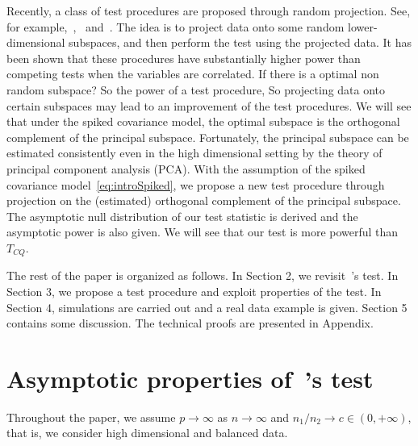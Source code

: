 \documentclass[review]{elsarticle}
\theoremstyle{plain}
\theoremstyle{definition}
\theoremstyle{remark}
\begin{document}
Recently, a class of test procedures are proposed through random projection.
See, for example,~\cite{Lopes2015A},~\cite{Thulin2014A} and~\cite{Srivastava2014RAPTT}.
The idea is to project data onto some random lower-dimensional subspaces, and then perform the test using the projected data.
It has been shown that these procedures have substantially higher power than competing tests when the variables are correlated. 
{\color{red}
If there is a optimal non random subspace?
So the power of a test procedure,
So projecting data onto certain subspaces may lead to an improvement of the test procedures.
}
We will see that under the spiked covariance model, the optimal subspace is the orthogonal complement of the principal subspace.
Fortunately, the principal subspace can be estimated consistently even in the high dimensional setting by the theory of principal component analysis (PCA).
With the assumption of the spiked covariance model~\eqref{eq:introSpiked}, we propose a new test procedure through projection on the (estimated) orthogonal complement of the principal subspace.  
The asymptotic null distribution of our test statistic is derived and the asymptotic power is also given.
We will see that our test is more powerful than $T_{CQ}$.




The rest of the paper is organized as follows. In Section 2,  we revisit~\cite{Chen2010A}'s test.  In Section 3, we propose a test procedure and exploit properties of the test.  In Section 4, simulations are carried out and  a real data example is given. Section 5 contains some discussion. The technical proofs are presented in Appendix.

\section{Asymptotic properties of~\cite{Chen2010A}'s test}\label{sec:chen}
    Throughout the paper, we  assume $p\to \infty$ as $n\to \infty$ and ${n_1}/{n_2}\to c \in (0,+\infty)$, that is, we consider high dimensional and balanced data.
\end{document}
